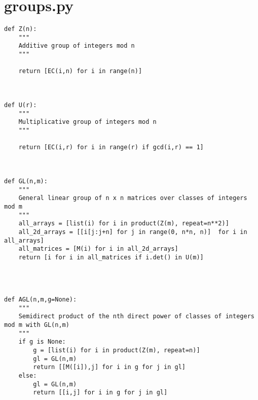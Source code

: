 \documentclass[12pt]{amsart}
\theoremstyle{plain}
\begin{document}
\section{groups.py}
\begin{verbatim}
def Z(n):
    """
    Additive group of integers mod n
    """

    return [EC(i,n) for i in range(n)]



def U(r):
    """
    Multiplicative group of integers mod n
    """

    return [EC(i,r) for i in range(r) if gcd(i,r) == 1]



def GL(n,m):
    """
    General linear group of n x n matrices over classes of integers mod m
    """
    all_arrays = [list(i) for i in product(Z(m), repeat=n**2)]
    all_2d_arrays = [[i[j:j+n] for j in range(0, n*n, n)]  for i in all_arrays]
    all_matrices = [M(i) for i in all_2d_arrays]
    return [i for i in all_matrices if i.det() in U(m)]




def AGL(n,m,g=None):
    """
    Semidirect product of the nth direct power of classes of integers mod m with GL(n,m)
    """
    if g is None:
        g = [list(i) for i in product(Z(m), repeat=n)]
        gl = GL(n,m)
        return [[M([i]),j] for i in g for j in gl]
    else:
        gl = GL(n,m)
        return [[i,j] for i in g for j in gl]
\end{verbatim}
\end{document}
